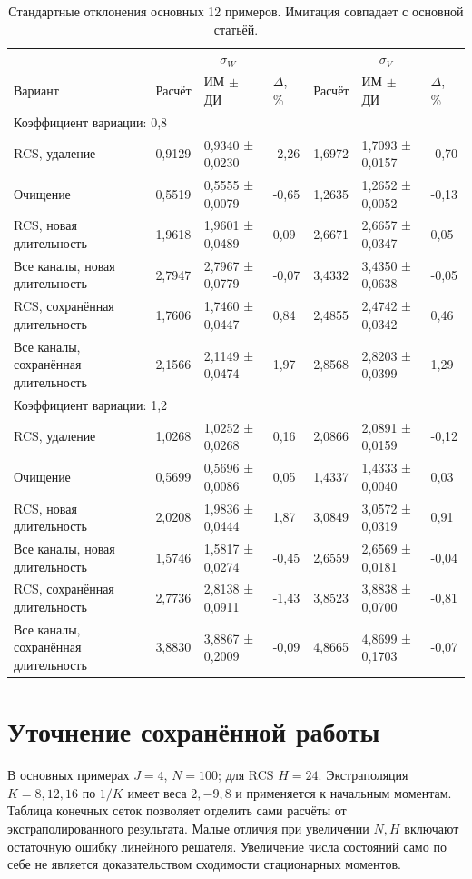 \documentclass[a4paper,12pt]{article}
\begin{document}
\begin{table}[!htbp]
\centering\small\setlength{\tabcolsep}{2pt}
\begin{tabular}{@{}p{4.16cm}p{1.61cm}p{2.83cm}p{1.28cm}p{1.61cm}p{2.83cm}p{1.28cm}@{}}
\toprule
 & \multicolumn{3}{c}{$\sigma_W$} & \multicolumn{3}{c}{$\sigma_V$} \\
Вариант & Расчёт & ИМ $\pm$ ДИ & $\Delta$, \% & Расчёт & ИМ $\pm$ ДИ & $\Delta$, \% \\
\midrule
\multicolumn{7}{l}{Коэффициент вариации: 0,8} \\
RCS, удаление & 0,9129 & 0,9340 ± 0,0230 & -2,26 & 1,6972 & 1,7093 ± 0,0157 & -0,70 \\
Очищение & 0,5519 & 0,5555 ± 0,0079 & -0,65 & 1,2635 & 1,2652 ± 0,0052 & -0,13 \\
RCS, новая длительность & 1,9618 & 1,9601 ± 0,0489 & 0,09 & 2,6671 & 2,6657 ± 0,0347 & 0,05 \\
Все каналы, новая длительность & 2,7947 & 2,7967 ± 0,0779 & -0,07 & 3,4332 & 3,4350 ± 0,0638 & -0,05 \\
RCS, сохранённая длительность & 1,7606 & 1,7460 ± 0,0447 & 0,84 & 2,4855 & 2,4742 ± 0,0342 & 0,46 \\
Все каналы, сохранённая длительность & 2,1566 & 2,1149 ± 0,0474 & 1,97 & 2,8568 & 2,8203 ± 0,0399 & 1,29 \\
\multicolumn{7}{l}{Коэффициент вариации: 1,2} \\
RCS, удаление & 1,0268 & 1,0252 ± 0,0268 & 0,16 & 2,0866 & 2,0891 ± 0,0159 & -0,12 \\
Очищение & 0,5699 & 0,5696 ± 0,0086 & 0,05 & 1,4337 & 1,4333 ± 0,0040 & 0,03 \\
RCS, новая длительность & 2,0208 & 1,9836 ± 0,0444 & 1,87 & 3,0849 & 3,0572 ± 0,0319 & 0,91 \\
Все каналы, новая длительность & 1,5746 & 1,5817 ± 0,0274 & -0,45 & 2,6559 & 2,6569 ± 0,0181 & -0,04 \\
RCS, сохранённая длительность & 2,7736 & 2,8138 ± 0,0911 & -1,43 & 3,8523 & 3,8838 ± 0,0700 & -0,81 \\
Все каналы, сохранённая длительность & 3,8830 & 3,8867 ± 0,2009 & -0,09 & 4,8665 & 4,8699 ± 0,1703 & -0,07 \\
\bottomrule
\end{tabular}
\caption{Стандартные отклонения основных 12 примеров. Имитация совпадает с основной статьёй.}
\label{tab:std}
\end{table}

\section{Уточнение сохранённой работы}
В основных примерах \(J=4\), \(N=100\); для RCS \(H=24\). Экстраполяция \(K=8,12,16\) по \(1/K\) имеет веса \(2,-9,8\) и применяется к начальным моментам. Таблица конечных сеток позволяет отделить сами расчёты от экстраполированного результата. Малые отличия при увеличении \(N,H\) включают остаточную ошибку линейного решателя. Увеличение числа состояний само по себе не является доказательством сходимости стационарных моментов.
\end{document}
